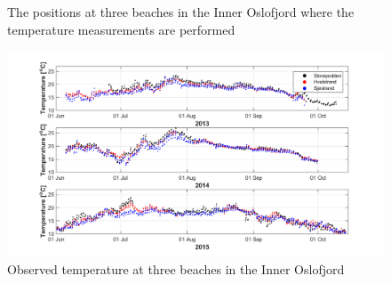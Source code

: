 \begin{figure}[ht]
{\begin{minipage}[r]{0.4\textwidth}
 \\
 \\
\end{minipage}
}
\caption{\small
The positions at three beaches in the Inner Oslofjord where the temperature measurements are performed}
\label{fig:kart_strand}
\end{figure}

\begin{figure}[ht]
\centerline{
\includegraphics*[trim=2cm 0 2cm 0cm,clip=true,width=\textwidth]{Figurer/badetemp}
}
\caption{\small
Observed temperature at three beaches in the Inner Oslofjord}
\label{fig:temp_strand}
\end{figure}

